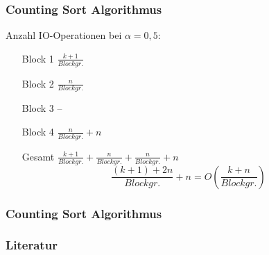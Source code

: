 \documentclass{beamer}
\begin{document}
\begin{frame}
  \frametitle{Counting Sort Algorithmus}
  Anzahl IO-Operationen bei $\alpha = 0,5$:
  \begin{itemize}
    \item[Block 1] $\frac{k+1}{Blockgr.}$
    \item[Block 2] $\frac{n}{Blockgr.}$
    \item[Block 3] --
    \item[Block 4] $\frac{n}{Blockgr.} + n$
    \item[Gesamt] $\frac{k+1}{Blockgr.} + \frac{n}{Blockgr.} + \frac{n}{Blockgr.} + n$
    \begin{equation*}
    \frac{(k + 1) + 2n}{Blockgr.} + n = O(\frac{k + n}{Blockgr.})
    \end{equation*}
  \end{itemize}
\end{frame}

\begin{frame}
  \frametitle{Counting Sort Algorithmus}
\end{frame}

\begin{frame}
  \frametitle{Literatur}

  
  
\end{frame}
\end{document}
